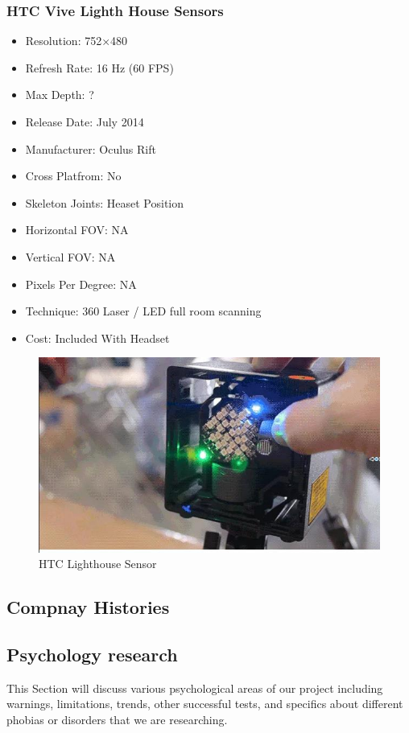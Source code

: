 \documentclass[a4paper,10pt,twoside]{article}
\begin{document}
	\subsubsection{HTC Vive Lighth House Sensors}
\begin{itemize}
  \item Resolution: 752×480
  \item Refresh Rate: 16 Hz (60 FPS)
  \item Max Depth: ?
  \item Release Date: July 2014
  \item Manufacturer: Oculus Rift
  \item Cross Platfrom: No
  \item Skeleton Joints: Heaset Position
  \item Horizontal FOV: NA
  \item Vertical FOV: NA
  \item Pixels Per Degree: NA
  \item Technique: 360 Laser / LED full room scanning 
  \item Cost: Included With Headset
\end{itemize}
\begin{figure}[H]
	\includegraphics[width=\linewidth,height=\paperheight,keepaspectratio]{viveLight.jpg}
	\caption{HTC Lighthouse Sensor}
	\label{fig:viveCam}
	\end{figure}
	\pagebreak

\subsection{Compnay Histories}

\subsection {Psychology research}
This Section will discuss various psychological areas of our project including warnings, limitations, trends, other successful tests, and specifics about different phobias or disorders 
that we are researching. 
\end{document}
